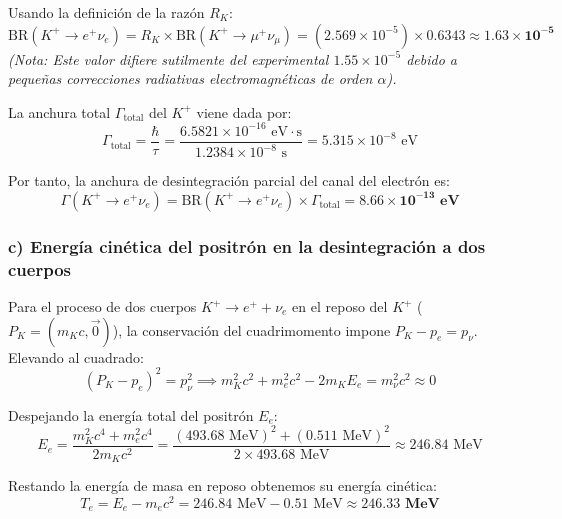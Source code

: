 \begin{problema}
Usando la definición de la razón $R_K$:
\begin{equation*}
\text{BR}(K^+ \rightarrow e^+ \nu_e) = R_K \times \text{BR}(K^+ \rightarrow \mu^+ \nu_\mu) = (2.569 \times 10^{-5}) \times 0.6343 \approx \mathbf{1.63 \times 10^{-5}}
\end{equation*}
\textit{(Nota: Este valor difiere sutilmente del experimental $1.55 \times 10^{-5}$ debido a pequeñas correcciones radiativas electromagnéticas de orden $\alpha$).}

La anchura total $\Gamma_{\text{total}}$ del $K^+$ viene dada por:
\begin{equation*}
\Gamma_{\text{total}} = \frac{\hbar}{\tau} = \frac{6.5821 \times 10^{-16} \text{ eV}\cdot\text{s}}{1.2384 \times 10^{-8} \text{ s}} = 5.315 \times 10^{-8} \text{ eV}
\end{equation*}

Por tanto, la anchura de desintegración parcial del canal del electrón es:
\begin{equation*}
\Gamma(K^+ \rightarrow e^+ \nu_e) = \text{BR}(K^+ \to e^+ \nu_e) \times \Gamma_{\text{total}} = \mathbf{8.66 \times 10^{-13} \text{ eV}}
\end{equation*}

\subsubsection*{c) Energía cinética del positrón en la desintegración a dos cuerpos}

Para el proceso de dos cuerpos $K^+ \rightarrow e^+ + \nu_e$ en el reposo del $K^+$ ($P_K = (m_K c, \vec{0})$), la conservación del cuadrimomento impone $P_K - p_e = p_\nu$. Elevando al cuadrado:
\begin{equation*}
(P_K - p_e)^2 = p_\nu^2 \implies m_K^2 c^2 + m_e^2 c^2 - 2 m_K E_e = m_\nu^2 c^2 \approx 0
\end{equation*}

Despejando la energía total del positrón $E_e$:
\begin{equation*}
E_e = \frac{m_K^2 c^4 + m_e^2 c^4}{2 m_K c^2} = \frac{(493.68 \text{ MeV})^2 + (0.511 \text{ MeV})^2}{2 \times 493.68 \text{ MeV}} \approx 246.84 \text{ MeV}
\end{equation*}

Restando la energía de masa en reposo obtenemos su energía cinética:
\begin{equation*}
T_e = E_e - m_e c^2 = 246.84 \text{ MeV} - 0.51 \text{ MeV} \approx \mathbf{246.33 \text{ MeV}}
\end{equation*}
\end{problema}
